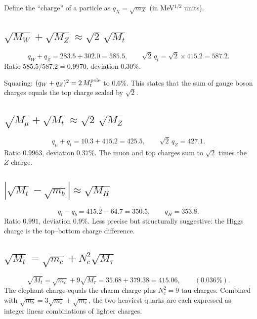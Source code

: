 \documentclass[11pt]{article}
\begin{document}
Define the ``charge'' of a particle as $q_X = \sqrt{m_X}$
(in MeV$^{1/2}$ units).

\subsection{$\sqrt{M_W} + \sqrt{M_Z} \approx \sqrt{2}\,\sqrt{M_t}$}

\begin{equation}
  q_W + q_Z = 283.5 + 302.0 = 585.5,
  \qquad
  \sqrt{2}\,q_t = \sqrt{2}\times 415.2 = 587.2.
\end{equation}
Ratio $585.5/587.2 = 0.9970$, deviation $0.30\%$.

Squaring: $(q_W+q_Z)^2 = 2\,M_t^{\rm pole}$ to $0.6\%$.
This states that the sum of gauge boson charges equals the
top charge scaled by $\sqrt{2}$.

\subsection{$\sqrt{M_\mu} + \sqrt{M_t} \approx \sqrt{2}\,\sqrt{M_Z}$}

\begin{equation}
  q_\mu + q_t = 10.3 + 415.2 = 425.5,
  \qquad
  \sqrt{2}\,q_Z = 427.1.
\end{equation}
Ratio $0.9963$, deviation $0.37\%$.  The muon and top charges
sum to $\sqrt{2}$ times the $Z$ charge.

\subsection{$|\sqrt{M_t} - \sqrt{m_b}| \approx \sqrt{M_H}$}

\begin{equation}
  q_t - q_b = 415.2 - 64.7 = 350.5,
  \qquad q_H = 353.8.
\end{equation}
Ratio $0.991$, deviation $0.9\%$.  Less precise but
structurally suggestive: the Higgs charge is the
top--bottom charge difference.

\subsection{$\sqrt{M_t} = \sqrt{m_c} + N_c^2\sqrt{M_\tau}$}

\begin{equation}
  \sqrt{M_t} = \sqrt{m_c} + 9\sqrt{M_\tau}
  = 35.68 + 379.38 = 415.06,
  \qquad (0.036\%).
\end{equation}
The elephant charge equals the charm charge plus $N_c^2 = 9$
tau charges.  Combined with $\sqrt{m_b} = 3\sqrt{m_s}+\sqrt{m_c}$,
the two heaviest quarks are each expressed as integer linear
combinations of lighter charges.
\end{document}
